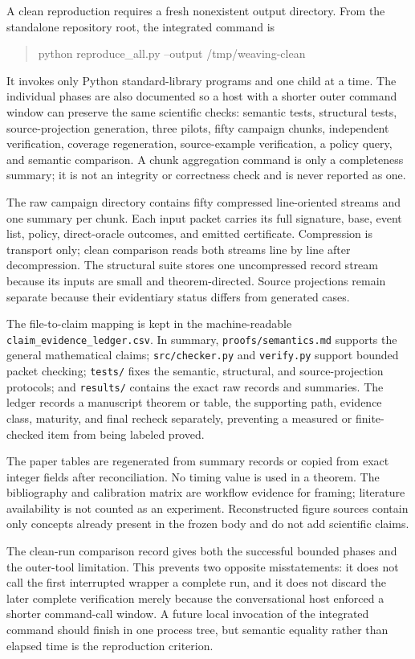 A clean reproduction requires a fresh nonexistent output directory.  From the
standalone repository root, the integrated command is
\begin{quote}\small\ttfamily
python reproduce\_all.py --output /tmp/weaving-clean
\end{quote}
It invokes only Python standard-library programs and one child at a time.  The
individual phases are also documented so a host with a shorter outer command window
can preserve the same scientific checks: semantic tests, structural tests,
source-projection generation, three pilots, fifty campaign chunks, independent
verification, coverage regeneration, source-example verification, a policy query,
and semantic comparison.  A chunk aggregation command is only a completeness summary;
it is not an integrity or correctness check and is never reported as one.

The raw campaign directory contains fifty compressed line-oriented streams and one
summary per chunk.  Each input packet carries its full signature, base, event list,
policy, direct-oracle outcomes, and emitted certificate.  Compression is transport
only; clean comparison reads both streams line by line after decompression.  The
structural suite stores one uncompressed record stream because its inputs are small
and theorem-directed.  Source projections remain separate because their evidentiary
status differs from generated cases.

The file-to-claim mapping is kept in the machine-readable
\texttt{claim\_evidence\_ledger.csv}.  In summary,
\texttt{proofs/semantics.md} supports the general mathematical claims;
\texttt{src/checker.py} and \texttt{verify.py} support bounded packet checking;
\texttt{tests/} fixes the semantic, structural, and source-projection protocols; and
\texttt{results/} contains the exact raw records and summaries.  The ledger records a
manuscript theorem or table, the supporting path, evidence class, maturity, and final
recheck separately, preventing a measured or finite-checked item from being labeled
proved.

The paper tables are regenerated from summary records or copied from exact integer
fields after reconciliation.  No timing value is used in a theorem.  The bibliography
and calibration matrix are workflow evidence for framing; literature availability is
not counted as an experiment.  Reconstructed figure sources contain only concepts
already present in the frozen body and do not add scientific claims.

The clean-run comparison record gives both the successful bounded phases and the
outer-tool limitation.  This prevents two opposite misstatements: it does not call the
first interrupted wrapper a complete run, and it does not discard the later complete
verification merely because the conversational host enforced a shorter command-call
window.  A future local invocation of the integrated command should finish in one
process tree, but semantic equality rather than elapsed time is the reproduction
criterion.
